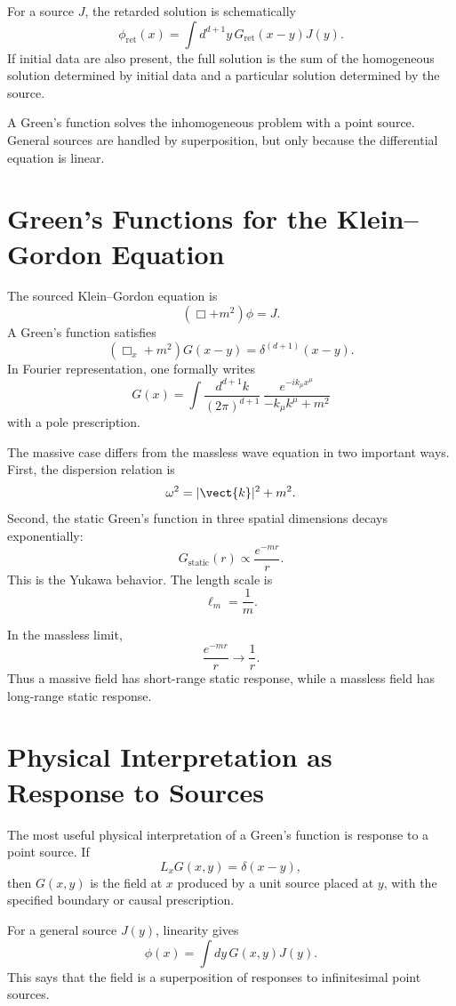 For a source \(J\), the retarded solution is schematically
\[
    \phi_{\mathrm{ret}}(x)=\int d^{d+1}y\,G_{\mathrm{ret}}(x-y)J(y).
\]
If initial data are also present, the full solution is the sum of the homogeneous
solution determined by initial data and a particular solution determined by the
source.

\begin{remarkbox}
A Green's function solves the inhomogeneous problem with a point source. General
sources are handled by superposition, but only because the differential equation
is linear.
\end{remarkbox}

\section{Green's Functions for the Klein--Gordon Equation}

The sourced Klein--Gordon equation is
\[
    (\Box+m^2)\phi=J.
\]
A Green's function satisfies
\[
    (\Box_x+m^2)G(x-y)=\delta^{(d+1)}(x-y).
\]
In Fourier representation, one formally writes
\[
    G(x)=\int\frac{d^{d+1}k}{(2\pi)^{d+1}}\,
    \frac{e^{-ik_\mu x^\mu}}{-k_\mu k^\mu+m^2}
\]
with a pole prescription.

The massive case differs from the massless wave equation in two important ways.
First, the dispersion relation is
\[
    \omega^2=|\vect{k}|^2+m^2.
\]
Second, the static Green's function in three spatial dimensions decays
exponentially:
\[
    G_{\mathrm{static}}(r)\propto\frac{e^{-mr}}{r}.
\]
This is the Yukawa behavior. The length scale is
\[
    \ell_m=\frac{1}{m}.
\]

In the massless limit,
\[
    \frac{e^{-mr}}{r}\longrightarrow\frac{1}{r}.
\]
Thus a massive field has short-range static response, while a massless field has
long-range static response.

\section{Physical Interpretation as Response to Sources}

The most useful physical interpretation of a Green's function is response to a
point source. If
\[
    L_xG(x,y)=\delta(x-y),
\]
then \(G(x,y)\) is the field at \(x\) produced by a unit source placed at \(y\),
with the specified boundary or causal prescription.

For a general source \(J(y)\), linearity gives
\[
    \phi(x)=\int dy\,G(x,y)J(y).
\]
This says that the field is a superposition of responses to infinitesimal point
sources.

